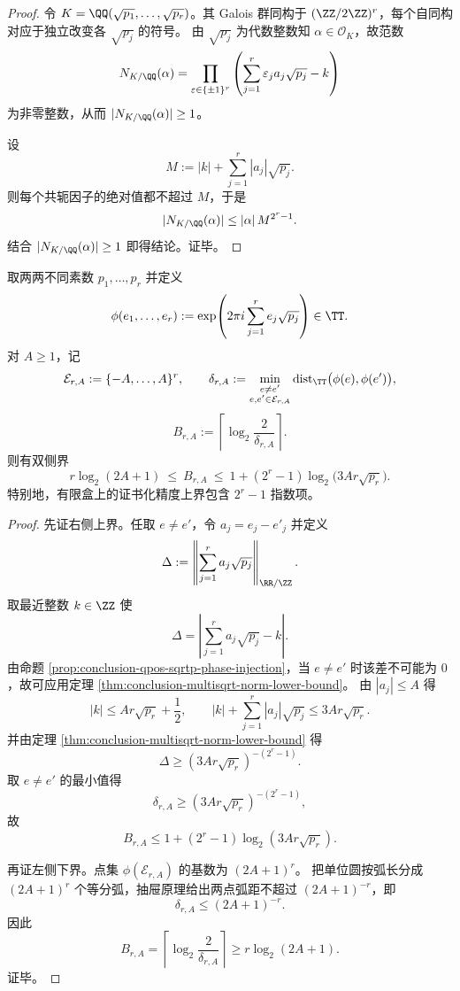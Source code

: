 \begin{proof}
令 \(K=\QQ(\sqrt{p_1},\dots,\sqrt{p_r})\)。其 Galois 群同构于 \((\ZZ/2\ZZ)^r\)，每个自同构对应于独立改变各 \(\sqrt{p_j}\) 的符号。
由 \(\sqrt{p_j}\) 为代数整数知 \(\alpha\in\mathcal O_K\)，故范数
\[
N_{K/\QQ}(\alpha)
=
\prod_{\varepsilon\in\{\pm1\}^r}
\left(\sum_{j=1}^r \varepsilon_j a_j\sqrt{p_j}-k\right)
\]
为非零整数，从而 \(|N_{K/\QQ}(\alpha)|\ge 1\)。

设
\[
M:=|k|+\sum_{j=1}^r |a_j|\sqrt{p_j}.
\]
则每个共轭因子的绝对值都不超过 \(M\)，于是
\[
|N_{K/\QQ}(\alpha)|\le |\alpha|\,M^{2^r-1}.
\]
结合 \(|N_{K/\QQ}(\alpha)|\ge 1\) 即得结论。证毕。
\end{proof}

\begin{corollary}[单圈相位化的有限盒精度窗口]\label{cor:conclusion-prime-singlephase-precision-window-exp2r}
取两两不同素数 \(p_1,\dots,p_r\) 并定义
\[
\phi(e_1,\dots,e_r):=\exp\!\left(2\pi i\sum_{j=1}^r e_j\sqrt{p_j}\right)\in\TT.
\]
对 \(A\ge 1\)，记
\[
\mathcal E_{r,A}:=\{-A,\dots,A\}^r,\qquad
\delta_{r,A}:=\min_{\substack{e\neq e'\\ e,e'\in\mathcal E_{r,A}}}
\mathrm{dist}_{\TT}\bigl(\phi(e),\phi(e')\bigr),
\]
\[
B_{r,A}:=\left\lceil\log_2\frac{2}{\delta_{r,A}}\right\rceil.
\]
则有双侧界
\[
r\log_2(2A+1)\ \le\ B_{r,A}\ \le\
1+(2^r-1)\log_2\!\bigl(3Ar\sqrt{p_r}\bigr).
\]
特别地，有限盒上的证书化精度上界包含 \(2^r-1\) 指数项。
\end{corollary}

\begin{proof}
先证右侧上界。任取 \(e\neq e'\)，令 \(a_j=e_j-e'_j\) 并定义
\[
\Delta:=\left\|\sum_{j=1}^r a_j\sqrt{p_j}\right\|_{\RR/\ZZ}.
\]
取最近整数 \(k\in\ZZ\) 使
\[
\Delta=\left|\sum_{j=1}^r a_j\sqrt{p_j}-k\right|.
\]
由命题 \ref{prop:conclusion-qpos-sqrtp-phase-injection}，当 \(e\neq e'\) 时该差不可能为 \(0\)，故可应用定理 \ref{thm:conclusion-multisqrt-norm-lower-bound}。
由 \(|a_j|\le A\) 得
\[
|k|\le Ar\sqrt{p_r}+\frac12,\qquad
|k|+\sum_{j=1}^r |a_j|\sqrt{p_j}\le 3Ar\sqrt{p_r}.
\]
并由定理 \ref{thm:conclusion-multisqrt-norm-lower-bound} 得
\[
\Delta\ge (3Ar\sqrt{p_r})^{-(2^r-1)}.
\]
取 \(e\neq e'\) 的最小值得
\[
\delta_{r,A}\ge (3Ar\sqrt{p_r})^{-(2^r-1)},
\]
故
\[
B_{r,A}
\le
1+(2^r-1)\log_2(3Ar\sqrt{p_r}).
\]

再证左侧下界。点集 \(\phi(\mathcal E_{r,A})\) 的基数为 \((2A+1)^r\)。
把单位圆按弧长分成 \((2A+1)^r\) 个等分弧，抽屉原理给出两点弧距不超过 \((2A+1)^{-r}\)，即
\[
\delta_{r,A}\le (2A+1)^{-r}.
\]
因此
\[
B_{r,A}
=\left\lceil\log_2\frac{2}{\delta_{r,A}}\right\rceil
\ge r\log_2(2A+1).
\]
证毕。
\end{proof}

